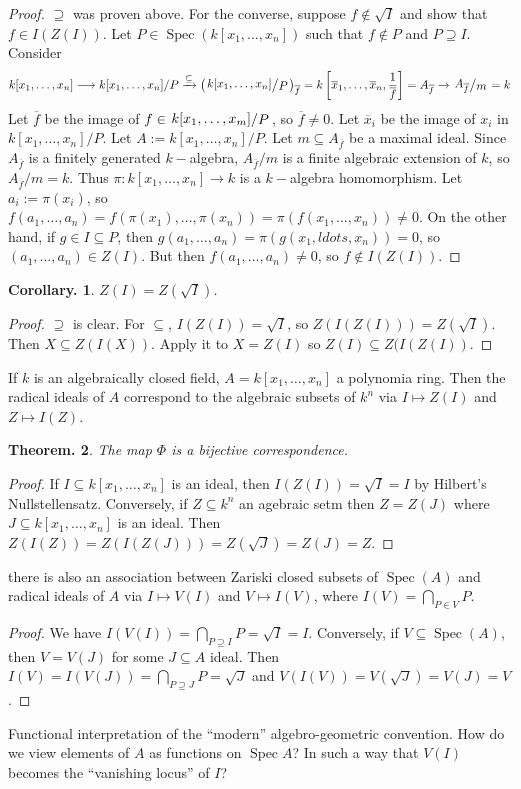 \documentclass[11pt, a4paper]{memoir}
\newcommand{\lto}[0]{\ensuremath{\longrightarrow}}
\newcommand{\fto}[1]{\ensuremath{\xrightarrow{\scriptstyle{#1}}}}
\theoremstyle{change}
\newtheorem{theorem}{Theorem.}[section]
\newtheorem{corollary}[theorem]{Corollary.}
\theoremstyle{plain}
\theoremstyle{nonumberplain}
\newtheorem{proof}{Proof}
\DeclareMathOperator{\Spec}{Spec}
\newcommand{\quot}[2]{\mathchoice{\left.\raisebox{0.10em}{$#1$}\middle/\raisebox{-0.10em}{$#2$}\right.}
                                 {\left.\raisebox{0.04em}{$#1$}\middle/\raisebox{-0.04em}{$#2$}\right.}
                                 {\left.\raisebox{0.01em}{$#1$}\middle/\raisebox{-0.01em}{$#2$}\right.}
                                 {\left.\raisebox{0em}{$#1$}\middle/\raisebox{0em}{$#2$}\right.}}
\numberwithin{equation}{section}
\begin{document}
\begin{proof}
    $\supseteq$ was proven above.
    For the converse, suppose $f\notin\sqrt{I}$ and show that $f\in I(Z(I))$.
    Let $P\in\Spec(k[x_1,\ldots,x_n])$ such that $f\notin P$ and $P\supseteq I$.
    Consider
    \begin{equation*}
        k[x_1,\ldots,x_n]\lto k[x_1,\ldots,x_n]/P\fto{\subseteq}\left(\quot{k[x_1,\ldots,x_n]}{P}\right)_{\overline{f}}=k\left[\overline{x}_1,\ldots,\overline{x}_n,\frac{1}{\overline{f}}\right]=A_{\overline{f}}\to \quot{A_{\overline{f}}}{m}=k
    \end{equation*}
    Let $\overline{f}$ be the image of $f\in\quot{k[x_1,\ldots,x_m]}{P}$, so $\overline{f}\neq 0$.
    Let $\overline{x}_i$ be the image of $x_i$ in $k[x_1,\ldots,x_n]/P$.
    Let $A:= k[x_1,\ldots,x_n]/P$.
    Let $m\subseteq A_{\overline{f}}$ be a maximal ideal.
    Since $A_{\overline{f}}$ is a finitely generated $k-$algebra, $A_{\overline{f}}/m$ is a finite algebraic extension of $k$, so $A_{\overline{f}}/m=k$.
    Thus $\pi:k[x_1,\ldots,x_n]\to k$ is a $k-$algebra homomorphism.
    Let $a_i:=\pi(x_i)$, so $f(a_1,\ldots,a_n)=f(\pi(x_1),\ldots,\pi(x_n))=\pi(f(x_1,\ldots,x_n))\neq 0$.
    On the other hand, if $g\in I\subseteq P$, then $g(a_1,\ldots,a_n)=\pi(g(x_1,ldots,x_n))=0$, so $(a_1,\ldots,a_n)\in Z(I)$.
    But then $f(a_1,\ldots,a_n)\neq 0$, so $f\notin I(Z(I))$.
\end{proof}
\begin{corollary}
    $Z(I)=Z(\sqrt{I})$.
\end{corollary}
\begin{proof}
    $\supseteq$ is clear.
    For $\subseteq$, $I(Z(I))=\sqrt{I}$, so $Z(I(Z(I)))=Z(\sqrt{I})$.
    Then $X\subseteq Z(I(X))$.
    Apply it to $X=Z(I)$ so $Z(I)\subseteq Z(I(Z(I))$.
\end{proof}
If $k$ is an algebraically closed field, $A=k[x_1,\ldots,x_n]$ a polynomia ring.
Then the radical ideals of $A$ correspond to the algebraic subsets of $k^n$ via $I\mapsto Z(I)$ and $Z\mapsto I(Z)$.
\begin{theorem}
    The map $\Phi$ is a bijective correspondence.
\end{theorem}
\begin{proof}
    If $I\subseteq k[x_1,\ldots,x_n]$ is an ideal, then $I(Z(I))=\sqrt{I}=I$ by Hilbert's Nullstellensatz.
    Conversely, if $Z\subseteq k^n$ an agebraic setm then $Z=Z(J)$ where $J\subseteq k[x_1,\ldots,x_n]$ is an ideal.
    Then $Z(I(Z))=Z(I(Z(J)))=Z(\sqrt{J})=Z(J)=Z$.
\end{proof}
there is also an association between Zariski closed subsets of $\Spec(A)$ and radical ideals of $A$ via $I\mapsto V(I)$ and $V\mapsto I(V)$, where $I(V)=\bigcap_{P\in V}P$.
\begin{proof}
    We have $I(V(I))=\bigcap_{P\supseteq I}P=\sqrt{I}=I$.
    Conversely, if $V\subseteq\Spec(A)$, then $V=V(J)$ for some $J\subseteq A$ ideal.
    Then $I(V)=I(V(J))=\bigcap_{P\supseteq J}P=\sqrt{J}$ and $V(I(V))=V(\sqrt{J})=V(J)=V$.
\end{proof}
Functional interpretation of the ``modern'' algebro-geometric convention.
How do we view elements of $A$ as functions on $\Spec A$?
In such a way that $V(I)$ becomes the ``vanishing locus'' of $I$?
\end{document}
